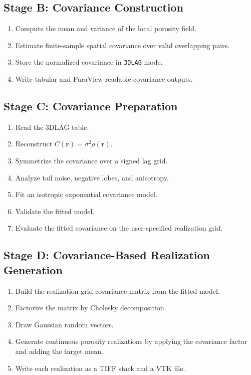\documentclass[11pt]{article}
\begin{document}
\subsection*{Stage B: Covariance Construction}
\begin{enumerate}[label=\arabic*.]
\item Compute the mean and variance of the local porosity field.
\item Estimate finite-sample spatial covariance over valid overlapping pairs.
\item Store the normalized covariance in \texttt{3DLAG} mode.
\item Write tabular and ParaView-readable covariance outputs.
\end{enumerate}

\subsection*{Stage C: Covariance Preparation}
\begin{enumerate}[label=\arabic*.]
\item Read the 3DLAG table.
\item Reconstruct \(C(\bm{r}) = \sigma^2 \rho(\bm{r})\).
\item Symmetrize the covariance over a signed lag grid.
\item Analyze tail noise, negative lobes, and anisotropy.
\item Fit an isotropic exponential covariance model.
\item Validate the fitted model.
\item Evaluate the fitted covariance on the user-specified realization grid.
\end{enumerate}

\subsection*{Stage D: Covariance-Based Realization Generation}
\begin{enumerate}[label=\arabic*.]
\item Build the realization-grid covariance matrix from the fitted model.
\item Factorize the matrix by Cholesky decomposition.
\item Draw Gaussian random vectors.
\item Generate continuous porosity realizations by applying the covariance
factor and adding the target mean.
\item Write each realization as a TIFF stack and a VTK file.
\end{enumerate}
\end{document}
